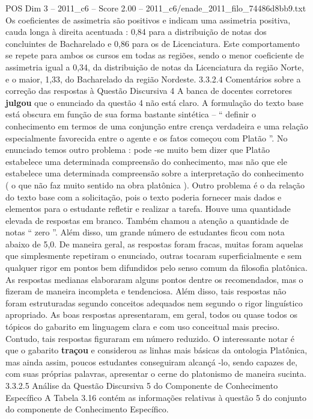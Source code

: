 \begin{textsample}{POS Dim 3 – 2011\_c6 – Score 2.00 – 2011\_c6/enade\_2011\_filo\_74486d8bb9.txt}
Os coeficientes de assimetria são positivos e indicam uma assimetria positiva, cauda longa à direita acentuada : 0,84 para a distribuição de notas dos concluintes de Bacharelado e 0,86 para os de Licenciatura.
Este comportamento se repete para ambos os cursos em todas as regiões, sendo o menor coeficiente de assimetria igual a 0,34, da distribuição de notas da Licenciatura da região Norte, e o maior, 1,33, do Bacharelado da região Nordeste. 3.3.2.4 Comentários sobre a correção das respostas à Questão Discursiva 4 A banca de docentes corretores \textbf{julgou} que o enunciado da questão 4 não está claro.
A formulação do texto base está obscura em função de sua forma bastante sintética – “ definir o conhecimento em termos de uma conjunção entre crença verdadeira e uma relação especialmente favorecida entre o agente e os fatos começou com Platão ”.
No enunciado temos outro problema : pode -se muito bem dizer que Platão estabelece uma determinada compreensão do conhecimento, mas não que ele estabelece uma determinada compreensão sobre a interpretação do conhecimento ( o que não faz muito sentido na obra platônica ).
Outro problema é o da relação do texto base com a solicitação, pois o texto poderia fornecer mais dados e elementos para o estudante refletir e realizar a tarefa.
Houve uma quantidade elevada de respostas em branco.
Também chamou a atenção a quantidade de notas “ zero ”.
Além disso, um grande número de estudantes ficou com nota abaixo de 5,0.
De maneira geral, as respostas foram fracas, muitas foram aquelas que simplesmente repetiram o enunciado, outras tocaram superficialmente e sem qualquer rigor em pontos bem difundidos pelo senso comum da filosofia platônica.
As respostas medianas elaboraram alguns pontos dentre os recomendados, mas o fizeram de maneira incompleta e tendenciosa.
Além disso, tais respostas não foram estruturadas segundo conceitos adequados nem segundo o rigor linguístico apropriado.
As boas respostas apresentaram, em geral, todos ou quase todos os tópicos do gabarito em linguagem clara e com uso conceitual mais preciso.
Contudo, tais respostas figuraram em número reduzido.
O interessante notar é que o gabarito \textbf{traçou} e considerou as linhas mais básicas da ontologia Platônica, mas ainda assim, poucos estudantes conseguiram alcançá -lo, sendo capazes de, com suas próprias palavras, apresentar o cerne do platonismo de maneira sucinta. 3.3.2.5 Análise da Questão Discursiva 5 do Componente de Conhecimento Específico A Tabela 3.16 contém as informações relativas à questão 5 do conjunto do componente de Conhecimento Específico.

\end{textsample}

